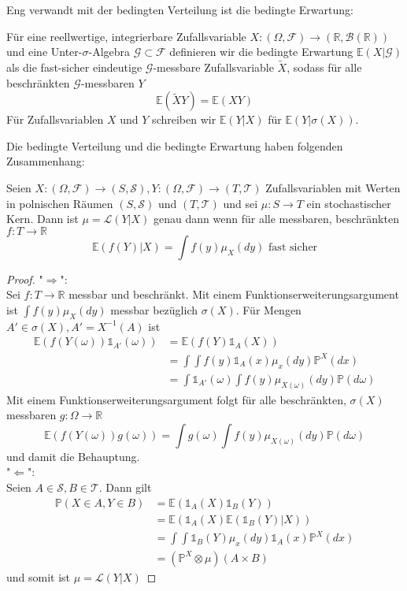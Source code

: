 Eng verwandt mit der bedingten Verteilung ist die bedingte Erwartung:
\begin{definition}
Für eine reellwertige, integrierbare Zufallsvariable $X: (\Omega, \mathcal{F}) \rightarrow (\mathbb{R}, \mathcal{B}(\mathbb{R}))$ und eine Unter-$\sigma$-Algebra $\mathcal{G}\subset \mathcal{F}$ definieren wir die bedingte Erwartung $\mathbb{E}(X\vert \mathcal{G})$ als die fast-sicher eindeutige $\mathcal{G}$-messbare Zufallsvariable $\tilde{X}$, sodass für alle beschränkten $\mathcal{G}$-messbaren $Y$
$$\mathbb{E}(\tilde{X}Y) = \mathbb{E}(XY)$$
Für Zufallsvariablen $X$ und $Y$ schreiben wir $\mathbb{E}(Y\vert X)$ für $\mathbb{E}(Y \vert \sigma(X))$.
\end{definition}
Die bedingte Verteilung und die bedingte Erwartung haben folgenden Zusammenhang:
\begin{lemma}\label{thm:law_expectancy_connection}
Seien $X: (\Omega, \mathcal{F})\rightarrow (S, \mathcal{S}), Y: (\Omega, \mathcal{F})\rightarrow(T, \mathcal{T})$ Zufallsvariablen mit Werten in polnischen Räumen $(S, \mathcal{S})$ und $(T, \mathcal{T})$ und sei $\mu: S\rightarrow T$ ein stochastischer Kern. Dann ist $\mu = \mathcal{L}(Y\vert X)$ genau dann wenn für alle messbaren, beschränkten $f: T\rightarrow \mathbb{R}$
$$\mathbb{E}(f(Y) \vert X) = \int f(y)\mu_X(dy) \text{ fast sicher}$$
\end{lemma}
\begin{proof}
    "$\Rightarrow$": \\
    Sei $f:T\rightarrow \mathbb{R}$ messbar und beschränkt. Mit einem Funktionserweiterungsargument ist $\int f(y)\mu_X(dy)$ messbar bezüglich $\sigma(X)$. Für Mengen $A' \in \sigma(X), A'=X^{-1}(A)$ ist 
    \begin{align*}
    \mathbb{E}(f(Y(\omega))\mathds{1}_{A'}(\omega)) &= \mathbb{E}(f(Y)\mathds{1}_A(X))\\
    &=\int \int f(y) \mathds{1}_A(x)\mu_x(dy)\mathbb{P}^X(dx) \\
    &= \int \mathds{1}_{A'}(\omega) \int f(y)\mu_{X(\omega)}(dy) \mathbb{P}(d\omega)
    \end{align*}
    Mit einem Funktionserweiterungsargument folgt für alle beschränkten, $\sigma(X)$ messbaren $g: \Omega\rightarrow \mathbb{R}$
    $$\mathbb{E}(f(Y(\omega))g(\omega)) = \int g(\omega)\int f(y)\mu_{X(\omega)}(dy)\mathbb{P}(d\omega)$$
    und damit die Behauptung. \\
    "$\Leftarrow$": \\
    Seien $A \in \mathcal{S}, B\in \mathcal{T}$. Dann gilt
    \begin{align*}
        \mathbb{P}(X\in A, Y\in B) &= \mathbb{E}(\mathds{1}_A(X) \mathds{1}_B(Y)) \\
        &= \mathbb{E}(\mathds{1}_A(X)\mathbb{E}(\mathds{1}_B(Y)\vert X)) \\
        &= \int \int \mathds{1}_B(Y) \mu_x(dy) \mathds{1}_A(x)\mathbb{P}^X(dx) \\
        &= (\mathbb{P}^X \otimes \mu)(A\times B)
    \end{align*}
    und somit ist $\mu=\mathcal{L}(Y\vert X)$
\end{proof}

